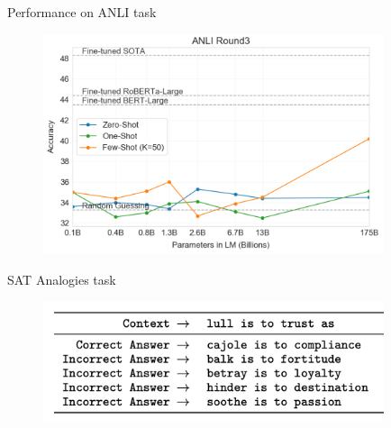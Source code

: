 \begin{vbframe}{Performance on ANLI task}

\vfill

	\begin{figure}
		\centering
		\includegraphics[width=10cm]{figure/anliperf.png}
	\end{figure}

\vfill

\end{vbframe}




\begin{vbframe}{SAT Analogies task}

\vfill

	\begin{figure}
		\centering
		\includegraphics[width=10cm]{figure/satformat.png}
	\end{figure}

\vfill

\end{vbframe}




